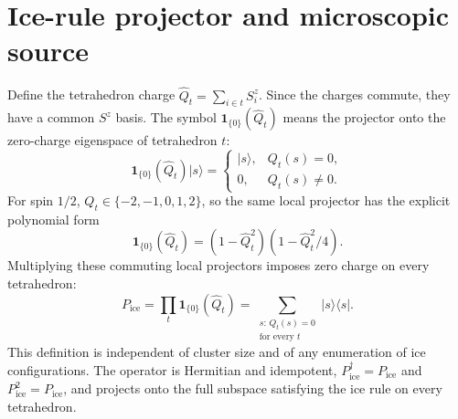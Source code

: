 \documentclass[aps,prl,onecolumn,amsmath,amssymb]{revtex4-2}
\newcommand{\Pice}{P_{\mathrm{ice}}}
\begin{document}
\section{Ice-rule projector and microscopic source}

Define the tetrahedron charge $\widehat Q_t=\sum_{i\in t}S_i^z$.  Since the
charges commute, they have a common $S^z$ basis.  The symbol
$\mathbf 1_{\{0\}}(\widehat Q_t)$ means the projector onto the zero-charge
eigenspace of tetrahedron $t$:
\begin{equation}
 \mathbf 1_{\{0\}}(\widehat Q_t)|s\rangle=
 \begin{cases}
  |s\rangle,&Q_t(s)=0,\\
  0,&Q_t(s)\ne0.
 \end{cases}
\label{eq:local_ice_projector_si}
\end{equation}
For spin $1/2$, $Q_t\in\{-2,-1,0,1,2\}$, so the same local projector has the
explicit polynomial form
\begin{equation}
 \mathbf 1_{\{0\}}(\widehat Q_t)
 =(1-\widehat Q_t^2)(1-\widehat Q_t^2/4).
\end{equation}
Multiplying these commuting local projectors imposes zero charge on every
tetrahedron:
\begin{equation}
 \Pice=\prod_t\mathbf 1_{\{0\}}(\widehat Q_t)
 =\sum_{\substack{s:\,Q_t(s)=0\\\text{for every }t}}|s\rangle\langle s|.
\label{eq:ice_projector_si}
\end{equation}
This definition is independent of cluster size and of any enumeration of ice
configurations.  The operator is Hermitian and idempotent,
$\Pice^\dagger=\Pice$ and $\Pice^2=\Pice$, and projects onto the full subspace
satisfying the ice rule on every tetrahedron.
\end{document}
